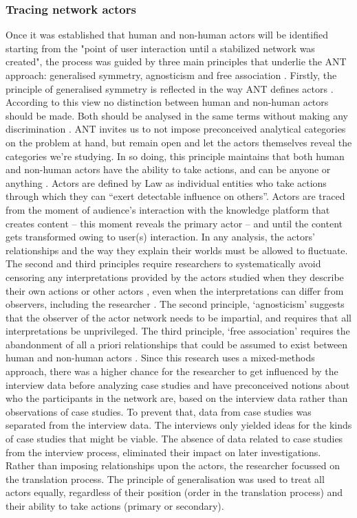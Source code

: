 \subsubsection{Tracing network actors}
Once it was established that human and non-human actors will be identified starting from the "point of user interaction until a stabilized network was created", the process was guided by three main principles that underlie the ANT approach: generalised symmetry, agnosticism and free association \cite{callon1986sociology}. Firstly, the principle of generalised symmetry is reflected in the way ANT defines actors \cite{van2003digital}. According to this view no distinction between human and non-human actors should be made. Both should be analysed in the same terms without making any discrimination \cite{callon1986sociology, law1986heterogeneity, law1987technology}. ANT invites us to not impose preconceived analytical categories on the problem at hand, but remain open and let the actors themselves reveal the categories we're studying. In so doing, this principle maintains that both human and non-human actors have the ability to take actions, and can be anyone or anything \cite{law1986heterogeneity}. Actors are defined by Law \cite{law1987technology} as individual entities who take actions through which they can “exert detectable influence on others”. Actors are traced from the moment of audience’s interaction with the knowledge platform that creates content – this moment reveals the primary actor – and until the content gets transformed owing to user(s) interaction. In any analysis, the actors’ relationships and the way they explain their worlds must be allowed to fluctuate. The second and third principles require researchers to systematically avoid censoring any interpretations provided by the actors studied when they describe their own actions or other actors \cite{callon1986sociology}, even when the interpretations can differ from observers, including the researcher \cite{law1986heterogeneity}. The second principle, ‘agnosticism’ suggests that the observer of the actor network needs to be impartial, and requires that all interpretations be unprivileged. The third principle, ‘free association’ requires the abandonment of all a priori relationships that could be assumed to exist between human and non-human actors \cite{callon1986sociology}. Since this research uses a mixed-methods approach, there was a higher chance for the researcher to get influenced by the interview data before analyzing case studies and have preconceived notions about who the participants in the network are, based on the interview data rather than observations of case studies. To prevent that, data from case studies was separated from the interview data. The interviews only yielded ideas for the kinds of case studies that might be viable. The absence of data related to case studies from the interview process, eliminated their impact on later investigations. Rather than imposing relationships upon the actors, the researcher focussed on the translation process. The principle of generalisation was used to treat all actors equally, regardless of their position (order in the translation process) and their ability to take actions (primary or secondary).

